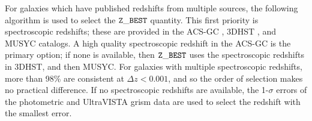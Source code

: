 \documentclass[twocolumn]{aastex6}
\begin{document}
For galaxies which have published redshifts from multiple sources, the following algorithm is used to select the $\tt Z\_BEST$ quantity. This first priority is spectroscopic redshifts; these are provided in the ACS-GC \citep{gri12}, 3DHST \citep{mom15}, and MUSYC \citep{car10} catalogs. A high quality spectroscopic redshift in the ACS-GC is the primary option; if none is available, then $\tt Z\_BEST$ uses the spectroscopic redshifts in 3DHST, and then MUSYC. For galaxies with multiple spectroscopic redshifts, more than 98\% are consistent at $\Delta z<0.001$, and so the order of selection makes no practical difference. If no spectroscopic redshifts are available, the 1-$\sigma$ errors of the photometric \citep[ACS-GC, 3DHST, MUSYC, UltraVISTA;][]{ilb13} and UltraVISTA grism data are used to select the redshift with the smallest error. %
 
\end{document}

